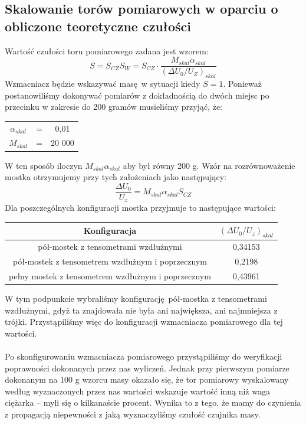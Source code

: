 \documentclass[a4paper, 12pt, titlepage]{article}
\begin{document}
		\subsection{Skalowanie torów pomiarowych w oparciu o obliczone teoretyczne czułości}
			Wartość czułości toru pomiarowego zadana jest wzorem:
			$$
				S = S_{CZ} S_W = S_{CZ} \cdot \frac{M_{skal}\alpha_{skal}}{(\Delta U_0 / U_Z)_{skal}}
			$$
			Wzmacniacz będzie wskazywać masę w sytuacji kiedy $S = 1$. Ponieważ postanowiliśmy dokonywać pomiarów z dokładnością do dwóch miejsc po przecinku w zakresie do 200 gramów musieliśmy przyjąć, że:
			\begin{center}
				\begin{tabular}{ccc}
					$\alpha_{skal}$ & = & 0,01 \\ 
					$M_{skal}$ & = & 20 000
				\end{tabular} 
			\end{center}
			W ten sposób iloczyn $M_{skal}\alpha_{skal}$ aby był równy 200 g. Wzór na rozrównoważenie mostka otrzymujemy przy tych założeniach jako następujący:
			$$
				\frac{\Delta U_0}{U_z} = M_{skal}\alpha_{skal} S_{CZ}
			$$
			Dla poszczególnych konfiguracji mostka przyjmuje to następujące wartości:
			\begin{center}
				\begin{tabular}{|c|c|}
					\hline
					Konfiguracja & $(\Delta U_0 / U_z)_{skal}$ \\ \hline
					pół-mostek z tensometrami wzdłużnymi & 0,34153 \\ \hline  
					pół-mostek z tensometrem wzdłużnym i poprzecznym & 0,2198 \\ \hline 
					pełny mostek z tensometrem wzdłużnym i poprzecznym & 0,43961 \\ \hline
				\end{tabular}
			\end{center}
			W tym podpunkcie wybraliśmy konfigurację pół-mostka z tensometrami wzdłużnymi, gdyż ta znajdowała nie była ani największa, ani najmniejsza z trójki. Przystąpiliśmy więc do konfiguracji wzmacniacza pomiarowego dla tej wartości. 
			\\ \\
			Po skonfigurowaniu wzmacniacza pomiarowego przystąpiliśmy do weryfikacji poprawności dokonanych przez nas wyliczeń. Jednak przy pierwszym pomiarze dokonanym na 100 g wzorcu masy okazało się, że tor pomiarowy wyskalowany według wyznaczonych przez nas wartości wskazuje wartość inną niż waga ciężarka -- myli się o kilkanaście procent. Wynika to z tego, że mamy do czynienia z propagacją niepewności z jaką wyznaczyliśmy czułość czujnika masy.
\end{document}
